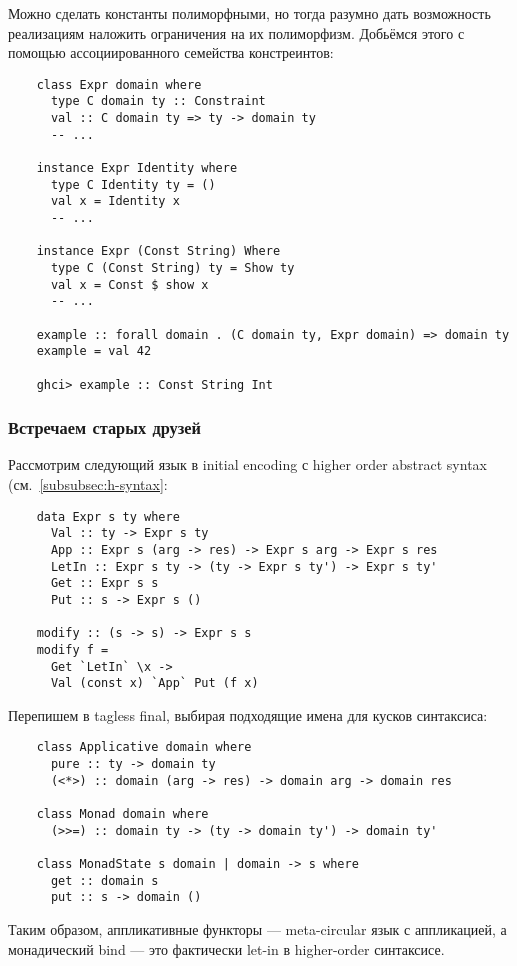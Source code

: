 Можно сделать константы полиморфными, но тогда разумно дать возможность реализациям наложить ограничения на их полиморфизм.
Добьёмся этого с помощью ассоциированного семейства констреинтов:
\begin{verbatim}
    class Expr domain where
      type C domain ty :: Constraint
      val :: C domain ty => ty -> domain ty
      -- ...

    instance Expr Identity where
      type C Identity ty = ()
      val x = Identity x
      -- ...

    instance Expr (Const String) Where
      type C (Const String) ty = Show ty
      val x = Const $ show x
      -- ...

    example :: forall domain . (C domain ty, Expr domain) => domain ty
    example = val 42

    ghci> example :: Const String Int
\end{verbatim}

\subsubsection{Встречаем старых друзей}

Рассмотрим следующий язык в initial encoding с higher order abstract syntax (см.~\ref{subsubsec:h-syntax}:
\begin{verbatim}
    data Expr s ty where
      Val :: ty -> Expr s ty
      App :: Expr s (arg -> res) -> Expr s arg -> Expr s res
      LetIn :: Expr s ty -> (ty -> Expr s ty') -> Expr s ty'
      Get :: Expr s s
      Put :: s -> Expr s ()

    modify :: (s -> s) -> Expr s s
    modify f =
      Get `LetIn` \x ->
      Val (const x) `App` Put (f x)
\end{verbatim}

Перепишем в tagless final, выбирая подходящие имена для кусков синтаксиса:
\begin{verbatim}
    class Applicative domain where
      pure :: ty -> domain ty
      (<*>) :: domain (arg -> res) -> domain arg -> domain res

    class Monad domain where
      (>>=) :: domain ty -> (ty -> domain ty') -> domain ty'

    class MonadState s domain | domain -> s where
      get :: domain s
      put :: s -> domain ()
\end{verbatim}

Таким образом, аппликативные функторы --- meta-circular язык с аппликацией, а монадический bind --- это фактически let-in в higher-order синтаксисе.

